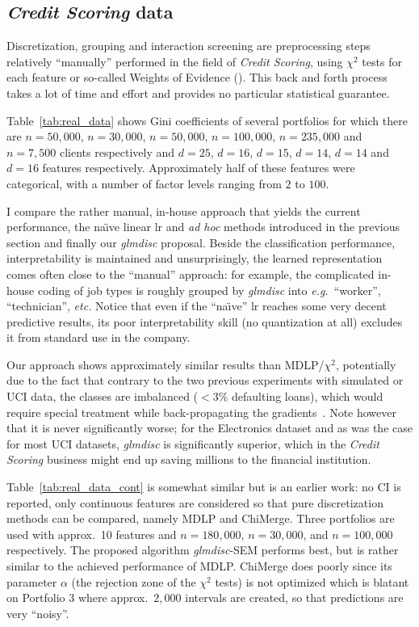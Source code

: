 \subsection{\textit{Credit Scoring} data} \label{subsec:exp_real}


Discretization, grouping and interaction screening are preprocessing steps relatively ``manually'' performed in the field of \textit{Credit Scoring}, using $\chi^2$ tests for each feature or so-called Weights of Evidence (\cite{zeng2014necessary}). This back and forth process takes a lot of time and effort and provides no particular statistical guarantee.

Table~\ref{tab:real_data} shows Gini coefficients of several portfolios for which there are $n=50,000$, $n=30,000$, $n=50,000$, $n=100,000$, $n=235,000$ and $n=7,500$ clients respectively and $d=25$, $d=16$, $d=15$, $d=14$, $d=14$ and $d=16$ features respectively. Approximately half of these features were categorical, with a number of factor levels ranging from $2$ to $100$. 

I compare the rather manual, in-house approach that yields the current performance, the na\"{\i}ve linear \gls{lr} and \textit{ad hoc} methods introduced in the previous section and finally our \textit{glmdisc} proposal. Beside the classification performance, interpretability is maintained and unsurprisingly, the learned representation comes often close to the ``manual'' approach: for example, the complicated in-house coding of job types is roughly grouped by \textit{glmdisc} into \textit{e.g.}\ ``worker'', ``technician'', \textit{etc.} Notice that even if the ``na\"{\i}ve'' \gls{lr} reaches some very decent predictive results, its poor interpretability skill (no quantization at all) excludes it from standard use in the company.

Our approach shows approximately similar results than MDLP/$\chi^2$, potentially due to the fact that contrary to the two previous experiments with simulated or UCI data, the classes are imbalanced ($< 3 \%$ defaulting loans), which would require special treatment while back-propagating the gradients~\cite{anand1993improved}. Note however that it is never significantly worse; for the Electronics dataset and as was the case for most UCI datasets, \textit{glmdisc} is significantly superior, which in the \textit{Credit Scoring} business might end up saving millions to the financial institution.

Table~\ref{tab:real_data_cont} is somewhat similar but is an earlier work: no CI is reported, only continuous features are considered so that pure discretization methods can be compared, namely MDLP and ChiMerge. Three portfolios are used with approx.\ 10 features and $n = 180{,}000$, $n = 30{,}000$, and $n = 100{,}000$ respectively. The proposed algorithm \textit{glmdisc}-SEM performs best, but is rather similar to the achieved performance of MDLP. ChiMerge does poorly since its parameter $\alpha$ (the rejection zone of the $\chi^2$ tests) is not optimized which is blatant on Portfolio 3 where approx.\ $2{,}000$ intervals are created, so that predictions are very ``noisy''.

